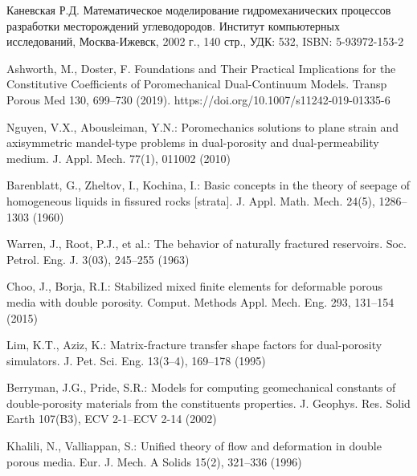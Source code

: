 \documentclass[14pt]{article}
\begin{document}
\newpage


\begin{thebibliography}{10}

	 Каневская Р.Д. Математическое моделирование гидромеханических процессов разработки месторождений углеводородов. Институт компьютерных исследований, Москва-Ижевск, 2002 г., 140 стр., УДК: 532, ISBN: 5-93972-153-2

	 Ashworth, M., Doster, F. Foundations and Their Practical Implications for the Constitutive Coefficients of Poromechanical Dual-Continuum Models. Transp Porous Med 130, 699–730 (2019). https://doi.org/10.1007/s11242-019-01335-6	
	
	 Nguyen, V.X., Abousleiman, Y.N.: Poromechanics solutions to plane strain and axisymmetric mandel-type problems in dual-porosity and dual-permeability medium. J. Appl. Mech. 77(1), 011002 (2010)

	 Barenblatt, G., Zheltov, I., Kochina, I.: Basic concepts in the theory of seepage of homogeneous liquids in
fissured rocks [strata]. J. Appl. Math. Mech. 24(5), 1286–1303 (1960)	
	
	 Warren, J., Root, P.J., et al.: The behavior of naturally fractured reservoirs. Soc. Petrol. Eng. J. 3(03), 245–255 (1963)
		
	 Choo, J., Borja, R.I.: Stabilized mixed finite elements for deformable porous media with double porosity.
Comput. Methods Appl. Mech. Eng. 293, 131–154 (2015)

	 Lim, K.T., Aziz, K.: Matrix-fracture transfer shape factors for dual-porosity simulators. J. Pet. Sci. Eng. 13(3–4), 169–178 (1995)
		
	 Berryman, J.G., Pride, S.R.: Models for computing geomechanical constants of double-porosity materials from the constituents properties. J. Geophys. Res. Solid Earth 107(B3), ECV 2-1–ECV 2-14 (2002)
	
	 Khalili, N., Valliappan, S.: Unified theory of flow and deformation in double porous media. Eur. J. Mech. A Solids 15(2), 321–336 (1996)
	
\end{thebibliography}
\end{document}
